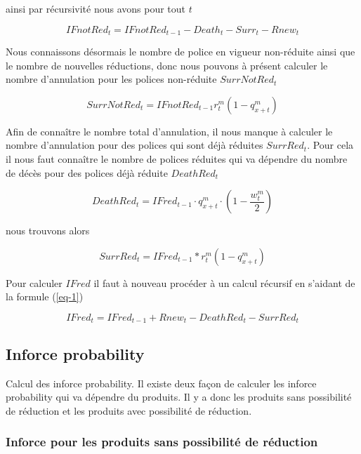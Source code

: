 \documentclass{article}
\begin{document}
ainsi par récursivité nous avons pour tout $t$

\begin{equation}
      IFnotRed_t = IFnotRed_{t-1} - Death_t - Surr_t - Rnew_t
\end{equation}

Nous connaissons désormais le nombre de police en vigueur non-réduite ainsi que le nombre de nouvelles réductions, donc nous pouvons à présent calculer le nombre d'annulation pour les polices non-réduite $SurrNotRed_t$

\begin{equation}
       SurrNotRed_t = IFnotRed_{t-1} r^m_t (1-q^m_{x+t}) 
\end{equation}

Afin de connaître le nombre total d'annulation, il nous manque à calculer le nombre d'annulation pour des polices qui sont déjà réduites $SurrRed_t$. Pour cela il nous faut connaître le nombre de polices réduites qui va dépendre du nombre de décès pour des polices déjà réduite $DeathRed_t$

\begin{equation}
       DeathRed_t = IFred_{t-1} \cdot q^m_{x+t} \cdot (1-\frac{w_t^m}{2})
\end{equation}

nous trouvons alors

\begin{equation}
		SurrRed_t = IFred_{t-1} * r^m_t (1- q^m_{x+t})
\end{equation}

Pour calculer $IFred$ il faut à nouveau procéder à un calcul récursif en s'aidant de la formule (\ref{eq-1})

\begin{equation}
      IFred_t = IFred_{t-1} + Rnew_t - DeathRed_t - SurrRed_t
\end{equation}






\subsection{Inforce probability}
Calcul des inforce probability. Il existe deux façon de calculer les inforce 				probability qui va dépendre du produits. Il y a donc les produits sans possibilité 			de réduction et les produits avec possibilité de réduction.

\subsubsection{Inforce pour les produits sans possibilité de réduction}
\end{document}
